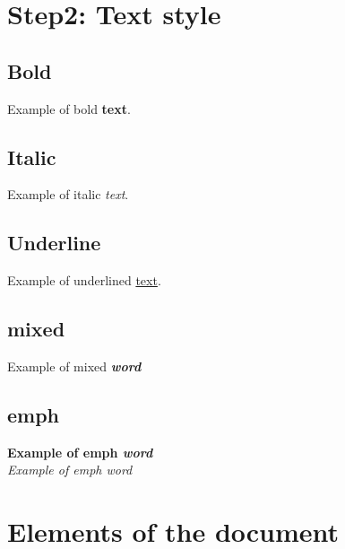 \documentclass[a4paper, oneside]{book}
\begin{document}


\tableofcontents
\clearpage

\setcounter{page}{1}
 
 





\chapter{Step2: Text style}
\section{Bold}
Example of bold \textbf{text}.
\section{Italic}
Example of italic \textit{text}.
\section{Underline}
Example of underlined \underline{text}.
\section{mixed}
Example of mixed \textbf{\textit{word}}
\section{emph}
\textbf{Example of emph \emph{word}}\\
\textit{Example of emph \emph{word}}

\chapter{Elements of the document}
\end{document}
